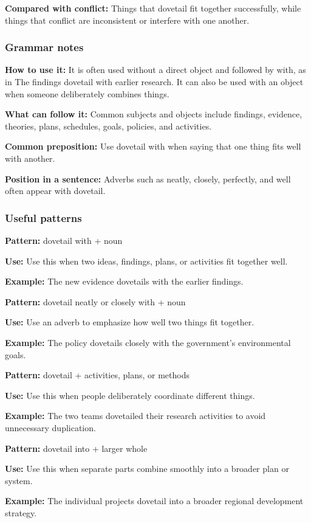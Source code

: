 \documentclass[11pt]{article}
\begin{document}
\textbf{Compared with conflict:} Things that dovetail fit together successfully, while things that conflict are inconsistent or interfere with one another.

\subsubsection{Grammar notes}
\textbf{How to use it:} It is often used without a direct object and followed by with, as in The findings dovetail with earlier research. It can also be used with an object when someone deliberately combines things.

\textbf{What can follow it:} Common subjects and objects include findings, evidence, theories, plans, schedules, goals, policies, and activities.

\textbf{Common preposition:} Use dovetail with when saying that one thing fits well with another.

\textbf{Position in a sentence:} Adverbs such as neatly, closely, perfectly, and well often appear with dovetail.

\subsubsection{Useful patterns}
\textbf{Pattern:} dovetail with + noun

\textbf{Use:} Use this when two ideas, findings, plans, or activities fit together well.

\textbf{Example:} The new evidence dovetails with the earlier findings.

\textbf{Pattern:} dovetail neatly or closely with + noun

\textbf{Use:} Use an adverb to emphasize how well two things fit together.

\textbf{Example:} The policy dovetails closely with the government's environmental goals.

\textbf{Pattern:} dovetail + activities, plans, or methods

\textbf{Use:} Use this when people deliberately coordinate different things.

\textbf{Example:} The two teams dovetailed their research activities to avoid unnecessary duplication.

\textbf{Pattern:} dovetail into + larger whole

\textbf{Use:} Use this when separate parts combine smoothly into a broader plan or system.

\textbf{Example:} The individual projects dovetail into a broader regional development strategy.
\end{document}

